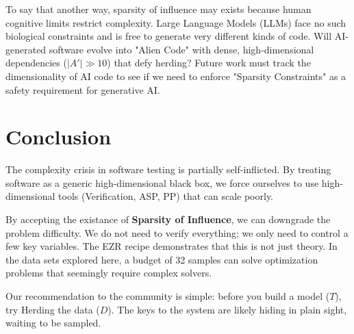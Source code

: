\documentclass[runningheads]{llncs}
\begin{document}
To say that another way,  sparsity of influence may exists   because  human cognitive
    limits restrict complexity. Large Language Models (LLMs) face no such
    biological constraints and is free to generate very different kinds of code. Will AI-generated software evolve into "Alien Code"
    with dense, high-dimensional dependencies ($|A'| \gg 10$) that defy
    herding? Future work must track the dimensionality of AI code to see if we
    need to enforce "Sparsity Constraints" as a safety requirement for
    generative AI.

    
\section{Conclusion}
The complexity crisis in software testing is partially self-inflicted. By 
treating software as a generic high-dimensional black box, we force ourselves 
to use high-dimensional tools (Verification, ASP, PP) that can scale poorly.

By accepting the existance of \textbf{Sparsity of Influence}, we 
can downgrade the problem difficulty. We do not need to verify everything; 
we only need to control a few key variables.  
The EZR recipe demonstrates that this is not just theory. In the data sets explored here, a budget of 
32 samples can solve optimization problems that seemingly require 
complex solvers.

Our recommendation to the community is simple: before you build a model ($T$), 
try Herding the data ($D$). The keys to the system are likely hiding in 
plain sight, waiting to be sampled.
\end{document}
